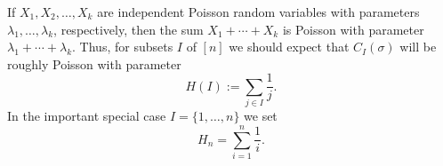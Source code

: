 If  $X_1, X_2, \ldots, X_k$ are independent Poisson random variables 
with parameters $\lambda_1,\ldots,\lambda_k$, respectively, then the sum
$X_1+\cdots +X_k$ is Poisson with parameter $\lambda_1+\cdots+\lambda_k$.
Thus, for subsets $I$ of $[n]$ we should expect that $C_I(\sigma)$ will be roughly 
Poisson with parameter 
\[
H(I) := \sum_{j\in I} \frac{1}{j}.
\]
In the important special case $I=\{1,\ldots,n\}$ we set 
\[
H_n = \sum_{i=1}^n \frac{1}{i}.
\]
